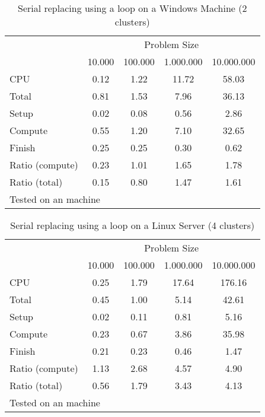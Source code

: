 \documentclass[letterpaper, 10pt]{article}
\begin{document}
\begin{table}[!h]
\centering
\caption{Serial replacing using a loop on a Windows Machine (2 clusters)}
\begin{tabular}{l*{4}{c}}\hline
& \multicolumn{4}{c}{Problem Size} \\
& 10.000 &           100.000 &          1.000.000 &         10.000.000 \\ \hline
CPU &     0.12 &      1.22 &     11.72 &     58.03 \\
Total &     0.81 &      1.53 &      7.96 &     36.13 \\
\hspace{2mm} Setup &     0.02 &      0.08 &      0.56 &      2.86 \\
\hspace{2mm} Compute &     0.55 &      1.20 &      7.10 &     32.65 \\
\hspace{2mm} Finish &     0.25 &      0.25 &      0.30 &      0.62 \\
\hline Ratio (compute) &     0.23 &      1.01 &      1.65 &      1.78 \\
Ratio (total) &     0.15 &      0.80 &      1.47 &      1.61 \\
\hline
\multicolumn{4}{l}{\footnotesize Tested on an \win1 machine}
\end{tabular}
\end{table}

\begin{table}[!h]
\centering
\caption{Serial replacing using a loop on a Linux Server (4 clusters)\label{tab:serialreplace_linux}}
\begin{tabular}{l*{4}{c}}\hline
& \multicolumn{4}{c}{Problem Size} \\
& 10.000 &           100.000 &          1.000.000 &         10.000.000 \\ \hline
CPU &     0.25 &      1.79 &     17.64 &    176.16 \\
Total &     0.45 &      1.00 &      5.14 &     42.61 \\
\hspace{2mm} Setup &     0.02 &      0.11 &      0.81 &      5.16 \\
\hspace{2mm} Compute &     0.23 &      0.67 &      3.86 &     35.98 \\
\hspace{2mm} Finish &     0.21 &      0.23 &      0.46 &      1.47 \\
\hline Ratio (compute) &     1.13 &      2.68 &      4.57 &      4.90 \\
Ratio (total) &     0.56 &      1.79 &      3.43 &      4.13 \\
\hline
\multicolumn{5}{l}{\footnotesize Tested on an \unix1 machine}
\end{tabular}
\end{table}
\end{document}
